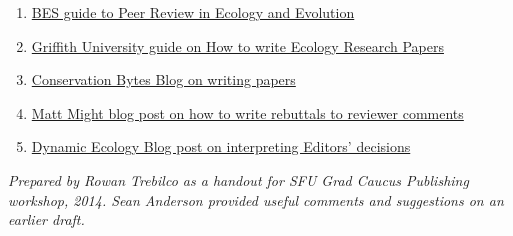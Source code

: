 \documentclass[11pt,]{article}
\begin{document}
\begin{enumerate}
\def\labelenumi{\arabic{enumi}.}
\itemsep1pt\parskip0pt
\item
  \href{http://www.britishecologicalsociety.org/wp-content/uploads/Publ_Peer-Review-Booklet.pdf}{BES
  guide to Peer Review in Ecology and Evolution}
\item
  \href{https://www.google.com/url?sa=t\&rct=j\&q=\&esrc=s\&source=web\&cd=1\&cad=rja\&uact=8\&ved=0CCgQFjAA\&url=http\%3A\%2F\%2Fwww.griffith.edu.au\%2F__data\%2Fassets\%2Fpdf_file\%2F0007\%2F435526\%2FWriting-Ecology-Research-Papers-July-2012.pdf\&ei=QHAzU97cL4XtoASU44DwBQ\&usg=AFQjCNETmGdH64aWIK9cdKO-g2i9LTl2nA\&sig2=bNmGEzkhR8Ucz_pzrd1uAQ\&bvm=bv.63808443,d.cGU}{Griffith
  University guide on How to write Ecology Research Papers}
\item
  \href{http://conservationbytes.com/2012/10/22/how-to-write-a-scientific-paper/}{Conservation
  Bytes Blog on writing papers}
\item
  \href{http://matt.might.net/articles/peer-review-rebuttals}{Matt Might
  blog post on how to write rebuttals to reviewer comments}
\item
  \href{http://dynamicecology.wordpress.com/2014/03/12/tell-me-again-what-major-revisions-are/}{Dynamic
  Ecology Blog post on interpreting Editors' decisions} 
\end{enumerate}

\emph{Prepared by Rowan Trebilco as a handout for SFU Grad Caucus
Publishing workshop, 2014. Sean Anderson provided useful comments and
suggestions on an earlier draft.}
\end{document}
